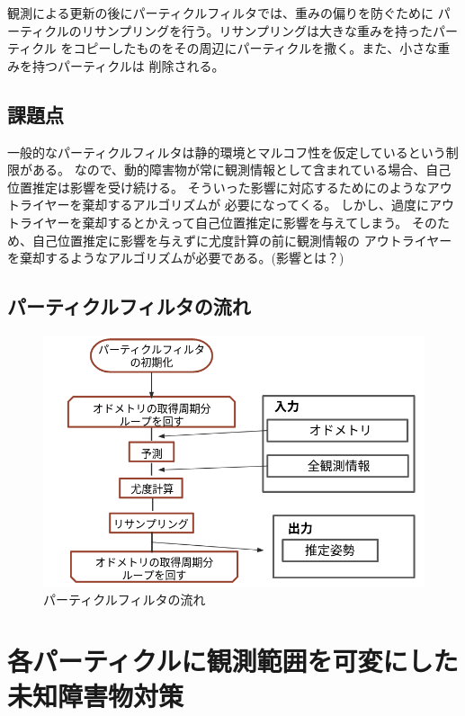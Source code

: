 観測による更新の後にパーティクルフィルタでは、重みの偏りを防ぐために
パーティクルのリサンプリングを行う。リサンプリングは大きな重みを持ったパーティクル
をコピーしたものをその周辺にパーティクルを撒く。また、小さな重みを持つパーティクルは
削除される。

\section{課題点}

一般的なパーティクルフィルタは静的環境とマルコフ性を仮定しているという制限がある。
なので、動的障害物が常に観測情報として含まれている場合、自己位置推定は影響を受け続ける。
そういった影響に対応するために\cite{赤井2019}のようなアウトライヤーを棄却するアルゴリズムが
必要になってくる。
しかし、過度にアウトライヤーを棄却するとかえって自己位置推定に影響を与えてしまう。
そのため、自己位置推定に影響を与えずに尤度計算の前に観測情報の
アウトライヤーを棄却するようなアルゴリズムが必要である。(影響とは？)

\newpage
\section{パーティクルフィルタの流れ}
\begin{figure}[h]
  \begin{center}
    \includegraphics[width=1.2\linewidth]{figs/particle_filter_flow.png}
    \caption{パーティクルフィルタの流れ}
    \label{fig:particle_filter_flow}
  \end{center}
\end{figure}

\chapter{各パーティクルに観測範囲を可変にした未知障害物対策}
